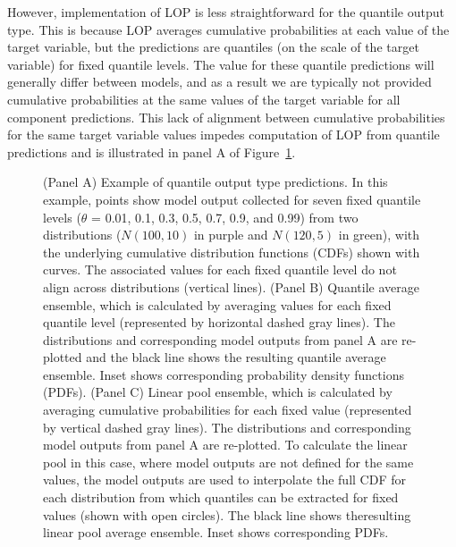 \documentclass[
]{article}
\begin{document}
However, implementation of LOP is less straightforward for the quantile
output type. This is because LOP averages cumulative probabilities at
each value of the target variable, but the predictions are quantiles (on
the scale of the target variable) for fixed quantile levels. The value
for these quantile predictions will generally differ between models, and
as a result we are typically not provided cumulative probabilities at
the same values of the target variable for all component predictions.
This lack of alignment between cumulative probabilities for the same
target variable values impedes computation of LOP from quantile
predictions and is illustrated in panel A of
Figure~\ref{fig-example-quantile-average-and-linear-pool}.

\begin{figure}


\caption{\label{fig-example-quantile-average-and-linear-pool}(Panel A)
Example of quantile output type predictions. In this example, points
show model output collected for seven fixed quantile levels (\(\theta\)
= 0.01, 0.1, 0.3, 0.5, 0.7, 0.9, and 0.99) from two distributions
(\(N(100, 10)\) in purple and \(N(120, 5)\) in green), with the
underlying cumulative distribution functions (CDFs) shown with curves.
The associated values for each fixed quantile level do not align across
distributions (vertical lines). (Panel B) Quantile average ensemble,
which is calculated by averaging values for each fixed quantile level
(represented by horizontal dashed gray lines). The distributions and
corresponding model outputs from panel A are re-plotted and the black
line shows the resulting quantile average ensemble. Inset shows
corresponding probability density functions (PDFs). (Panel C) Linear
pool ensemble, which is calculated by averaging cumulative probabilities
for each fixed value (represented by vertical dashed gray lines). The
distributions and corresponding model outputs from panel A are
re-plotted. To calculate the linear pool in this case, where model
outputs are not defined for the same values, the model outputs are used
to interpolate the full CDF for each distribution from which quantiles
can be extracted for fixed values (shown with open circles). The black
line shows theresulting linear pool average ensemble. Inset shows
corresponding PDFs.}

\end{figure}%
\end{document}
